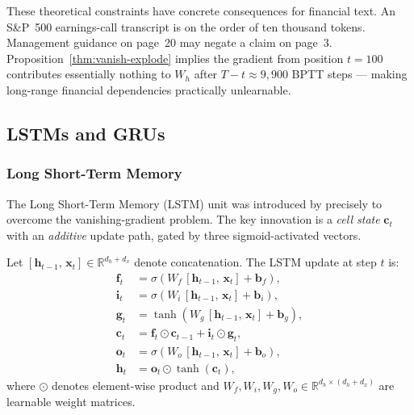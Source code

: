 \begin{deepdive}
These theoretical constraints have concrete consequences for financial text. An S\&P~500 earnings-call transcript is on the order of ten thousand tokens.
Management guidance on page~20 may negate a claim on page~3.
Proposition~\ref{thm:vanish-explode} implies the gradient from position $t = 100$
contributes essentially nothing to $W_h$ after $T - t \approx 9{,}900$ BPTT
steps --- making long-range financial dependencies practically unlearnable.

\subsection{LSTMs and GRUs}
\label{sec:sequential-lstm}

\subsubsection{Long Short-Term Memory}

The Long Short-Term Memory (LSTM) unit was introduced by \citet{hochreiter1997long} %
precisely to overcome the vanishing-gradient problem.
The key innovation is a \emph{cell state} $\mathbf{c}_t$ with an \emph{additive}
update path, gated by three sigmoid-activated vectors.

\begin{definition}
\label{def:lstm}
Let $[\mathbf{h}_{t-1},\,\mathbf{x}_t] \in \mathbb{R}^{d_h + d_x}$ denote
concatenation. The LSTM update at step $t$ is:
\begin{align}
  \mathbf{f}_t &= \sigma\!\left(W_f\,[\mathbf{h}_{t-1},\,\mathbf{x}_t]
    + \mathbf{b}_f\right), \label{eq:lstm-forget}\\
  \mathbf{i}_t &= \sigma\!\left(W_i\,[\mathbf{h}_{t-1},\,\mathbf{x}_t]
    + \mathbf{b}_i\right), \label{eq:lstm-input}\\
  \mathbf{g}_t &= \tanh\!\left(W_g\,[\mathbf{h}_{t-1},\,\mathbf{x}_t]
    + \mathbf{b}_g\right), \label{eq:lstm-candidate}\\
  \mathbf{c}_t &= \mathbf{f}_t \odot \mathbf{c}_{t-1}
    + \mathbf{i}_t \odot \mathbf{g}_t, \label{eq:lstm-cell}\\
  \mathbf{o}_t &= \sigma\!\left(W_o\,[\mathbf{h}_{t-1},\,\mathbf{x}_t]
    + \mathbf{b}_o\right), \label{eq:lstm-output}\\
  \mathbf{h}_t &= \mathbf{o}_t \odot \tanh(\mathbf{c}_t), \label{eq:lstm-hidden}
\end{align}
where $\odot$ denotes element-wise product and
$W_f, W_i, W_g, W_o \in \mathbb{R}^{d_h \times (d_h + d_x)}$ are learnable
weight matrices.
\end{definition}


\end{deepdive}

